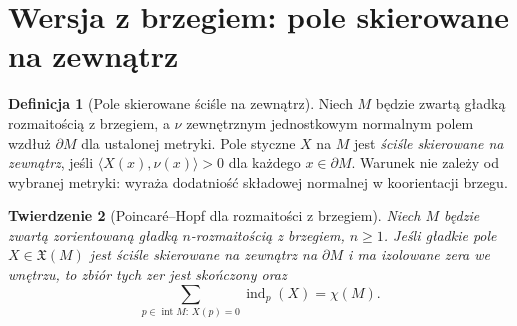 \documentclass[11pt,a4paper,oneside]{report}
\theoremstyle{plain}
\newtheorem{twierdzenie}{Twierdzenie}[section]
\theoremstyle{definition}
\newtheorem{definicja}[twierdzenie]{Definicja}
\theoremstyle{remark}
\begin{document}
\section{Wersja z brzegiem: pole skierowane na zewnątrz}
\begin{definicja}[Pole skierowane ściśle na zewnątrz]
Niech $M$ będzie zwartą gładką rozmaitością z brzegiem,
a $\nu$ zewnętrznym jednostkowym normalnym polem
wzdłuż $\partial M$ dla ustalonej metryki.
Pole styczne $X$ na $M$ jest \emph{ściśle skierowane na zewnątrz},
jeśli $\langle X(x),\nu(x)\rangle>0$ dla każdego
$x\in\partial M$. Warunek nie zależy od wybranej metryki:
wyraża dodatniość składowej normalnej w koorientacji brzegu.
\end{definicja}

\begin{twierdzenie}[Poincaré--Hopf dla rozmaitości z brzegiem]
\label{thm:PH-boundary-v11}
Niech $M$ będzie zwartą zorientowaną gładką
$n$-rozmaitością z brzegiem, $n\ge1$.
Jeśli gładkie pole $X\in\mathfrak X(M)$ jest ściśle skierowane
na zewnątrz na $\partial M$ i ma izolowane zera we wnętrzu,
to zbiór tych zer jest skończony oraz
\[
\sum_{p\in\operatorname{int}M:\,X(p)=0}\operatorname{ind}_p(X)=\chi(M).
\]
\end{twierdzenie}
\end{document}
